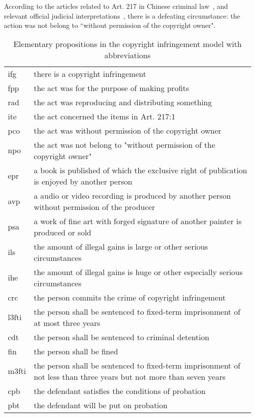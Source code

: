 \documentclass{IOS-Book-Article}
\begin{document}
\normalsize
\noindent 
According to the articles related to Art. 217 in Chinese criminal law~\cite{NPC1997CCL}, and relevant official judicial interpretations~\cite{SupremeCourt2011Judicial}, there is a defeating circumstance: the action was not belong to ``without permission of the copyright owner".


\begin{table}[b]
	\tiny
	\caption{Elementary propositions in the copyright infringement model with abbreviations}
	\label{tab:abbr}
	\begin{tabularx}{\textwidth}{p{0.5cm}|p{11cm}}
		\hline
		ifg & there is a copyright infringement\\
		fpp & the act was for the purpose of making profits\\
		rad & the act was reproducing and distributing something\\
		ite & the act concerned the items in Art. 217:1\\
		pco & the act was without permission of the copyright owner\\
		npo & the act was not belong to "without permission of the copyright owner"\\
		epr & a book is published of which the exclusive right of publication is enjoyed by another person\\
		avp & a audio or video recording is produced by another person without permission of the producer\\
		psa & a work of fine art with forged signature of another painter is produced or sold\\
		ils & the amount of illegal gains is large or other serious circumstances\\
		ihe & the amount of illegal gains is huge or other especially serious circumstances\\
		crc & the person commits the crime of copyright infringement\\
		l3fti & the person shall be sentenced to fixed-term imprisonment of at most three years\\
		cdt & the person shall be sentenced to criminal detention\\
		fin & the person shall be fined\\
		m3fti & the person shall be sentenced to fixed-term imprisonment of not less than three years but not more than seven years\\
		cpb & the defendant satisfies the conditions of probation\\
		pbt & the defendant will be put on probation\\
		\hline
	\end{tabularx}
\end{table}
\end{document}

